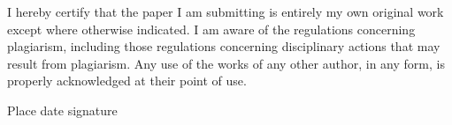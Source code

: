 I hereby certify that the paper I am submitting is entirely my own original work except
where otherwise indicated. I am aware of the regulations concerning
plagiarism, including those regulations concerning disciplinary actions that may result
from plagiarism. Any use of the works of any other author, in any form, is properly
acknowledged at their point of use.

\bigskip
\bigskip

Place \hfil date \hfil signature